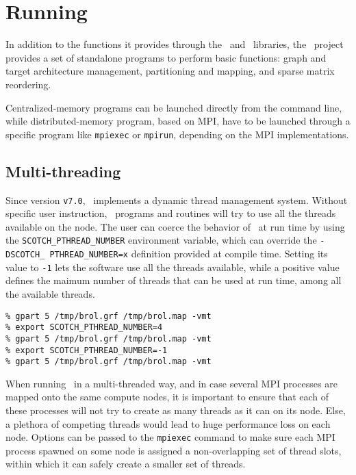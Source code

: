 
\section{Running \scotch}

In addition to the functions it provides through the \scotch\ and
\ptscotch\ libraries, the \scotch\ project provides a set of
standalone programs to perform basic functions: graph and target
architecture management, partitioning and mapping, and sparse matrix
reordering.

Centralized-memory programs can be launched directly from the command
line, while distributed-memory program, based on MPI, have to be
launched through a specific program like \texttt{mpiexec} or
\texttt{mpirun}, depending on the MPI implementations.

\subsection{Multi-threading}

Since version \texttt{v7.0}, \scotch\ implements a dynamic thread
management system. Without specific user instruction,
\scotch\ programs and routines will try to use all the threads
available on the node. The user can coerce the behavior of \scotch\ at
run time by using the \texttt{SCOTCH\_\lbt PTHREAD\_\lbt NUMBER}
environment variable, which can override the \texttt{-DSCOTCH\_\lbt
PTHREAD\_\lbt NUMBER=x} definition provided at compile time. Setting
its value to \texttt{-1} lets the software use all the threads
available, while a positive value defines the maimum number of threads
that can be used at run time, among all the available threads.

\begin{lstlisting}[style=language-b]
% export SCOTCH_PTHREAD_NUMBER=2
% gpart 5 /tmp/brol.grf /tmp/brol.map -vmt
% export SCOTCH_PTHREAD_NUMBER=4
% gpart 5 /tmp/brol.grf /tmp/brol.map -vmt
% export SCOTCH_PTHREAD_NUMBER=-1
% gpart 5 /tmp/brol.grf /tmp/brol.map -vmt
\end{lstlisting}

When running \ptscotch\ in a multi-threaded way, and in case several
MPI processes are mapped onto the same compute nodes, it is important
to ensure that each of these processes will not try to create as many
threads as it can on its node. Else, a plethora of competing threads
would lead to huge performance loss on each node. Options can be
passed to the \texttt{mpiexec} command to make sure each MPI process
spawned on some node is assigned a non-overlapping set of thread
slots, within which it can safely create a smaller set of threads.

